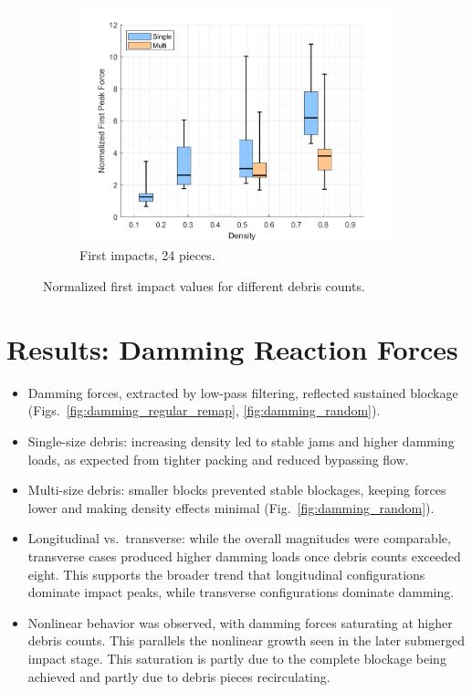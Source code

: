 \documentclass{article}
\begin{document}
\begin{figure}[htbp]
\begin{subfigure}[b]{0.32\textwidth}
        \centering
        \includegraphics[width=\textwidth]{Boxplot_Density_vs_PeakValues_24Debris.png}
        \caption{First impacts, 24 pieces.}
        \label{fig:boxplot_24}
    \end{subfigure}
    \caption{Normalized first impact values for different debris counts.}
    \label{fig:boxplots_side_by_side}
\end{figure}


\section{Results: Damming Reaction Forces}
\begin{itemize}
    \item Damming forces, extracted by low-pass filtering, reflected sustained blockage (Figs.~\ref{fig:damming_regular_remap}, \ref{fig:damming_random}).
    \item Single-size debris: increasing density led to stable jams and higher damming loads, as expected from tighter packing and reduced bypassing flow.
    \item Multi-size debris: smaller blocks prevented stable blockages, keeping forces lower and making density effects minimal (Fig.~\ref{fig:damming_random}).
    \item Longitudinal vs.\ transverse: while the overall magnitudes were comparable, transverse cases produced higher damming loads once debris counts exceeded eight. This supports the broader trend that longitudinal configurations dominate impact peaks, while transverse configurations dominate damming.
    \item Nonlinear behavior was observed, with damming forces saturating at higher debris counts. This parallels the nonlinear growth seen in the later submerged impact stage. This saturation is partly due to the complete blockage being achieved and partly due to debris pieces recirculating.
\end{itemize}
\end{document}
